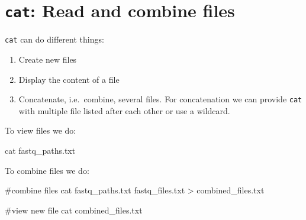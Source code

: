\documentclass[
  letterpaper,
  DIV=11,
  numbers=noendperiod]{scrreprt}
\newenvironment{Shaded}{}{}
\newcommand{\CommentTok}[1]{\textcolor[rgb]{0.42,0.45,0.49}{#1}}
\newcommand{\FunctionTok}[1]{\textcolor[rgb]{0.44,0.26,0.76}{#1}}
\newcommand{\NormalTok}[1]{\textcolor[rgb]{0.14,0.16,0.18}{#1}}
\newcommand{\OperatorTok}[1]{\textcolor[rgb]{0.14,0.16,0.18}{#1}}
\providecommand{\tightlist}{%
  \setlength{\itemsep}{0pt}\setlength{\parskip}{0pt}}\usepackage{longtable,booktabs,array}
\begin{document}
\section{\texorpdfstring{\texttt{cat}: Read and combine
files}{cat: Read and combine files}}\label{cat-read-and-combine-files}

\texttt{cat} can do different things:

\begin{enumerate}
\def\labelenumi{\arabic{enumi}.}
\tightlist
\item
  Create new files
\item
  Display the content of a file
\item
  Concatenate, i.e.~combine, several files. For concatenation we can
  provide \texttt{cat} with multiple file listed after each other or use
  a wildcard.
\end{enumerate}

To view files we do:

\begin{Shaded}
\begin{Highlighting}[]
\FunctionTok{cat}\NormalTok{ fastq\_paths.txt}
\end{Highlighting}
\end{Shaded}

To combine files we do:

\begin{Shaded}
\begin{Highlighting}[]
\CommentTok{\#combine files }
\FunctionTok{cat}\NormalTok{ fastq\_paths.txt fastq\_files.txt }\OperatorTok{\textgreater{}}\NormalTok{ combined\_files.txt}

\CommentTok{\#view new file }
\FunctionTok{cat}\NormalTok{ combined\_files.txt}
\end{Highlighting}
\end{Shaded}
\end{document}

